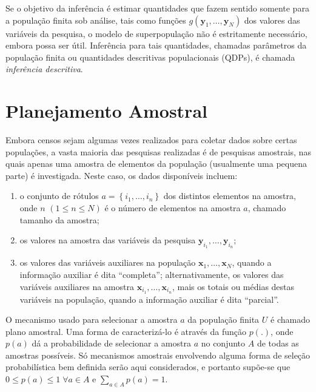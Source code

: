 \documentclass[]{book}
\theoremstyle{definition}
\theoremstyle{definition}
\theoremstyle{definition}
\theoremstyle{remark}
\begin{document}
Se o objetivo da inferência é estimar quantidades que fazem sentido
somente para a população finita sob análise, tais como funções
\(g\left( \mathbf{y}_1 ,\ldots, \mathbf{y}_N \right)\) dos valores das
variáveis da pesquisa, o modelo de superpopulação não é estritamente
necessário, embora possa ser útil. Inferência para tais quantidades,
chamadas parâmetros da população finita ou quantidades descritivas
populacionais (QDPs), é chamada \emph{inferência descritiva}.

\section{Planejamento Amostral}\label{planamo}

Embora censos sejam algumas vezes realizados para coletar dados sobre
certas populações, a vasta maioria das pesquisas realizadas é de
pesquisas amostrais, nas quais apenas uma amostra de elementos da
população (usualmente uma pequena parte) é investigada. Neste caso, os
dados disponíveis incluem:

\begin{enumerate}
\def\labelenumi{\arabic{enumi}.}
\item
  o conjunto de rótulos \(a=\left\{ i_1 ,\ldots, i_n \right\}\) dos
  distintos elementos na amostra, onde \(n\)
  \(\left( 1 \leq n \leq N \right)\) é o número de elementos na amostra
  \(a\), chamado tamanho da amostra;
\item
  os valores na amostra das variáveis da pesquisa
  \(\mathbf{y}_{i_1} ,\ldots, \mathbf{y}_{i_n}\);
\item
  os valores das variáveis auxiliares na população
  \(\mathbf{x}_1 ,\ldots, \mathbf{x}_N\), quando a informação auxiliar é
  dita ``completa''; alternativamente, os valores das variáveis
  auxiliares na amostra \(\mathbf{x}_{i_1} ,\ldots, \mathbf{x}_{i_n}\),
  mais os totais ou médias destas variáveis na população, quando a
  informação auxiliar é dita ``parcial''.
\end{enumerate}

O mecanismo usado para selecionar a amostra \(a\) da população finita
\(U\) é chamado plano amostral. Uma forma de caracterizá-lo é através da
função \(p\left( .\right)\), onde \(p(a)\) dá a probabilidade de
selecionar a amostra \(a\) no conjunto \(A\) de todas as amostras
possíveis. Só mecanismos amostrais envolvendo alguma forma de seleção
probabilística bem definida serão aqui considerados, e portanto supõe-se
que \(0 \leq p(a) \leq 1 \; \forall a \in A\) e
\(\sum_{a \in A} p(a)=1\).
\end{document}
